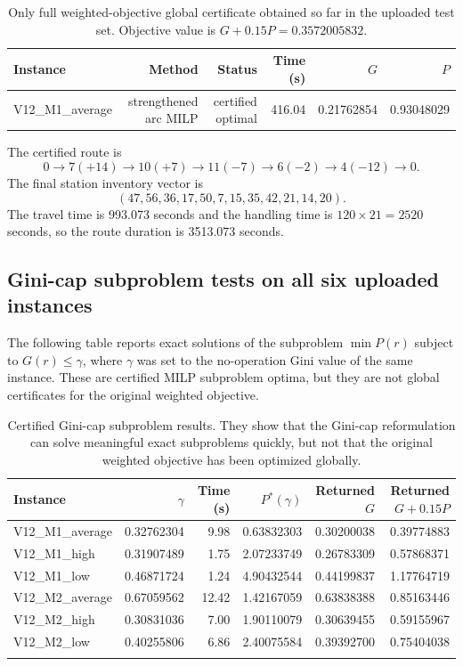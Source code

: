 \documentclass[11pt]{article}
\begin{document}
\begin{table}[h]
\centering
\begin{tabular}{lrrrrr}
\toprule
Instance & Method & Status & Time (s) & $G$ & $P$ \\
\midrule
V12\_M1\_average & strengthened arc MILP & certified optimal & 416.04 & 0.21762854 & 0.93048029 \\
\bottomrule
\end{tabular}
\caption{Only full weighted-objective global certificate obtained so far in the uploaded test set.  Objective value is $G+0.15P=0.3572005832$.}
\end{table}

The certified route is
\begin{equation}
    0\to 7(+14)\to 10(+7)\to 11(-7)\to 6(-2)\to 4(-12)\to 0.
\end{equation}
The final station inventory vector is
\begin{equation}
(47,56,36,17,50,7,15,35,42,21,14,20).
\end{equation}
The travel time is 993.073 seconds and the handling time is $120\times 21=2520$ seconds, so the route duration is 3513.073 seconds.

\subsection{Gini-cap subproblem tests on all six uploaded instances}

The following table reports exact solutions of the subproblem $\min P(r)$ subject to $G(r)\le\gamma$, where $\gamma$ was set to the no-operation Gini value of the same instance.  These are certified MILP subproblem optima, but they are not global certificates for the original weighted objective.

\begin{longtable}{lrrrrr}
\toprule
Instance & $\gamma$ & Time (s) & $P^*(\gamma)$ & Returned $G$ & Returned $G+0.15P$ \\
\midrule
V12\_M1\_average & 0.32762304 & 9.98 & 0.63832303 & 0.30200038 & 0.39774883 \\
V12\_M1\_high    & 0.31907489 & 1.75 & 2.07233749 & 0.26783309 & 0.57868371 \\
V12\_M1\_low     & 0.46871724 & 1.24 & 4.90432544 & 0.44199837 & 1.17764719 \\
V12\_M2\_average & 0.67059562 & 12.42 & 1.42167059 & 0.63838388 & 0.85163446 \\
V12\_M2\_high    & 0.30831036 & 7.00 & 1.90110079 & 0.30639455 & 0.59155967 \\
V12\_M2\_low     & 0.40255806 & 6.86 & 2.40075584 & 0.39392700 & 0.75404038 \\
\bottomrule
\caption{Certified Gini-cap subproblem results.  They show that the Gini-cap reformulation can solve meaningful exact subproblems quickly, but not that the original weighted objective has been optimized globally.}
\end{longtable}
\end{document}
